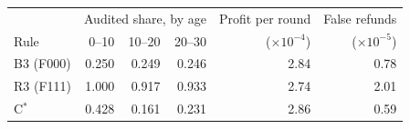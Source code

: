 \begin{tabular}{@{}lrrrrr@{}}\toprule
 & \multicolumn{3}{c}{Audited share, by age} & Profit per round & False refunds \\
Rule & 0--10 & 10--20 & 20--30 & ($\times 10^{-4}$) & ($\times 10^{-5}$) \\\midrule
B3 (F000) & 0.250 & 0.249 & 0.246 & 2.84 & 0.78 \\
R3 (F111) & 1.000 & 0.917 & 0.933 & 2.74 & 2.01 \\
C$^*$ & 0.428 & 0.161 & 0.231 & 2.86 & 0.59 \\
\bottomrule\end{tabular}
